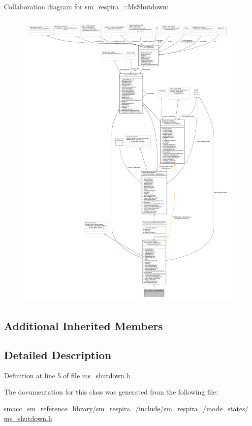 Collaboration diagram for sm\+\_\+respira\+\_\+:\+:Ms\+Shutdown\+:
\nopagebreak
\begin{figure}[H]
\begin{center}
\leavevmode
\includegraphics[width=350pt]{classsm__respira__1_1_1MsShutdown__coll__graph}
\end{center}
\end{figure}
\subsection*{Additional Inherited Members}


\subsection{Detailed Description}


Definition at line 5 of file ms\+\_\+shutdown.\+h.



The documentation for this class was generated from the following file\+:\begin{DoxyCompactItemize}
\item 
smacc\+\_\+sm\+\_\+reference\+\_\+library/sm\+\_\+respira\+\_/include/sm\+\_\+respira\+\_/mode\+\_\+states/\hyperlink{ms__shutdown_8h}{ms\+\_\+shutdown.\+h}\end{DoxyCompactItemize}
